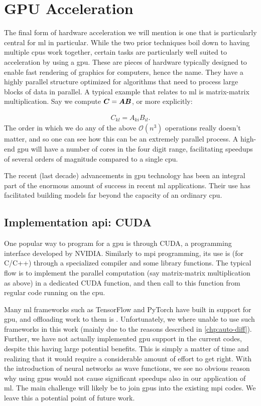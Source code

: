 \documentclass[Thesis.tex]{subfiles}
\begin{document}
\section{GPU Acceleration}

The final form of hardware acceleration we will mention is one that is
particularly central for \gls{ml} in particular. While the two prior techniques boil
down to having multiple \glspl{cpu} work together, certain tasks are particularly well
suited to acceleration by using a \gls{gpu}. These are
pieces of hardware typically designed to enable fast rendering of graphics for
computers, hence the name. They have a highly parallel structure optimized for
algorithms that need to process large blocks of data in parallel. A typical
example that relates to \gls{ml} is matrix-matrix multiplication. Say we compute $\bm{C} = \bm{A} \bm{B}$, or more explicitly:

\begin{align}
  C_{kl} = A_{ki}B_{il}.
\end{align}
The order in which we do any of the above $\mathcal{O}(n^3)$ operations really
doesn't matter, and so one can see how this can be an extremely parallel
process. A high-end \gls{gpu} will have a number of cores in the four digit range,
facilitating speedups of several orders of magnitude compared to a single \gls{cpu}.

The recent (last decade) advancements in \gls{gpu} technology has been an integral
part of the enormous amount of success in recent \gls{ml} applications. Their use has
facilitated building models far beyond the capacity of an ordinary \gls{cpu}.

\subsection{Implementation \acrshort{api}: CUDA}

One popular way to program for a \gls{gpu} is through CUDA, a programming
interface developed by NVIDIA. Similarly to \gls{mpi} programming, its use is (for
C/C++) through a specialized compiler and some library functions. The typical
flow is to implement the parallel computation (say matrix-matrix multiplication
as above) in a dedicated CUDA function, and then call to this function from
regular code running on the \gls{cpu}.

Many \gls{ml} frameworks such as TensorFlow and PyTorch have built in support for \gls{gpu},
and offloading work to them is . Unfortunately, we where unable to
use such frameworks in this work (mainly due to the reasons described in
\cref{chp:auto-diff}). Further, we have not actually implemented \gls{gpu} support in
the current codes, despite this having large potential benefits. This is simply
a matter of time and realizing that it would require a considerable amount of effort
to get right. With the introduction of neural networks as wave functions, we see
no obvious reason why using \glspl{gpu} would not cause significant speedups also in
our application of \gls{ml}. The main challenge will likely be to join
\glspl{gpu} into the existing \gls{mpi} codes. We leave this a potential point
of future work.
\end{document}
